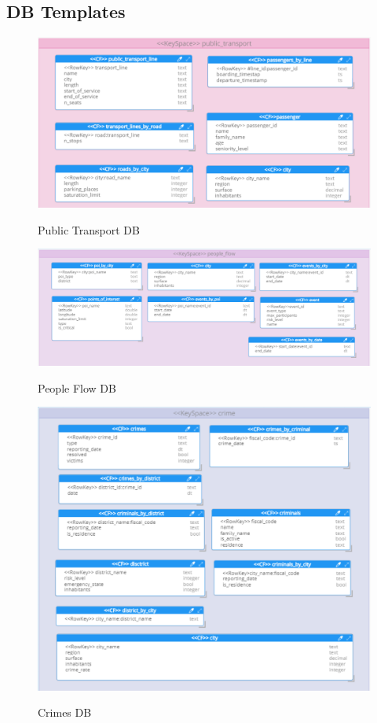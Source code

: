 \documentclass[../main.tex]{subfiles}
\begin{document}
    \subsection{DB Templates}
    \begin{figure}[H]
        \centering
        \includegraphics[scale = 0.6]{assets/db/cassandra_1.png} \\
        \caption[]{Public Transport DB}\label{fig:figure14}
    \end{figure}
    \begin{figure}[H]
        \centering
        \includegraphics[scale = 0.6]{assets/db/cassandra_2.png} \\
        \caption[]{People Flow DB}\label{fig:figure15}
    \end{figure}
    \begin{figure}[H]
        \centering
        \includegraphics[scale = 0.8]{assets/db/cassandra_3.png} \\
        \caption[]{Crimes DB}\label{fig:figure16}
    \end{figure}
\end{document}
